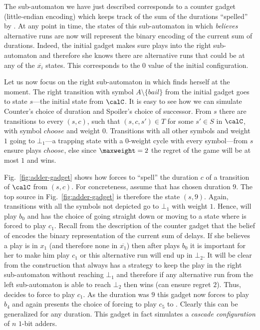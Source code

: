 \documentclass[a4paper]{article}
\begin{document}
The sub-automaton we have just described corresponds to a counter gadget
(little-endian encoding) which keeps track of the sum of the durations
``spelled'' by \adam. At any point in time, the states of this sub-automaton
in which \eve \emph{believes} alternative runs are now will represent the
binary encoding of the current sum of durations.  Indeed, the initial
gadget makes sure \eve plays into the right sub-automaton and therefore she
knows there are alternative runs that could be at any of the
$\overline{x_i}$ states. This corresponds to the $0$ value of the
initial configuration.

 Let us now focus on the right sub-automaton in which
\eve finds herself at the moment. The right transition with symbol
$A \setminus \{bail\}$ from the initial gadget goes to state $s$---the
initial state from $\calC$. It is easy to see how we can simulate
Counter's choice of duration and Spoiler's choice of successor. From $s$
there are transitions to every $(s,c)$, such that $(s,c,s') \in T$ for
some $s' \in S$ in $\calC$, with symbol $choose$ and weight $0$.
Transitions with all other symbols and weight $1$ going to $\bot_1$---a
trapping state with a $0$-weight cycle with every symbol---from $s$ ensure \adam
plays $choose$, else since $\maxweight = 2$ the regret of the game will be at
most $1$ and \eve wins.

Fig.~\ref{fig:adder-gadget} shows how \eve forces \adam to ``spell''
the duration $c$ of a transition of $\calC$ from $(s,c)$. For
concreteness, assume that \eve has chosen duration $9$. The top source
in Fig.~\ref{fig:adder-gadget} is therefore the state $(s,9)$. Again,
transitions with all the symbols not depicted go to $\bot_1$ with weight
$1$. Hence, \adam will play $b_0$ and \eve has the choice of going
straight down or moving to a state where \adam is forced to play $c_1$.
Recall from the description of the counter gadget that the belief of
\eve encodes the binary representation of the current sum of delays. If
she believes a play is in $x_1$ (and therefore none in $\overline{x_1}$)
then after \adam plays $b_0$ it is important for her to make him play
$c_1$ or this alternative run will end up in $\bot_2$. It will be clear
from the construction that \adam always has a strategy to keep the play
in the right sub-automaton without reaching $\bot_1$ and therefore if any
alternative run from the left sub-automaton is able to reach $\bot_2$ then
\adam wins (\ie can ensure regret $2$). Thus, \eve decides to force
\adam to play $c_1$. As the duration was $9$ this gadget now forces
\adam to play $b_4$ and again presents the choice of forcing \adam to
play $c_5$ to \eve. Clearly this can be generalized for any duration.
This gadget in fact simulates a \emph{cascade configuration} of $n$
$1$-bit adders.
\end{document}
